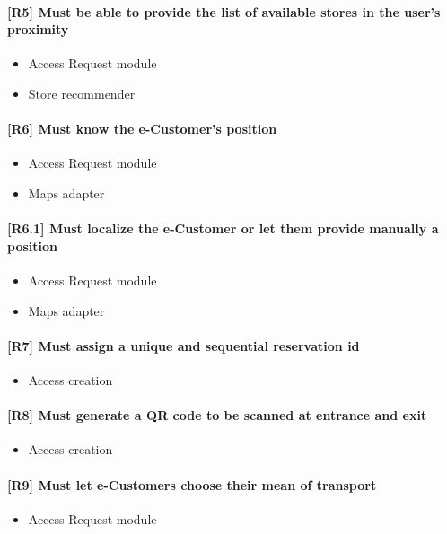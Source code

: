 \paragraph{[R5] Must be able to provide the list of available stores in the user’s proximity}
\begin{itemize}[itemsep=-1mm, topsep=-1mm]
	\item Access Request module
	\item Store recommender
\end{itemize}

\paragraph{[R6] Must know the e-Customer’s position}
\begin{itemize}[itemsep=-1mm, topsep=-1mm]
	\item Access Request module
	\item Maps adapter
\end{itemize}

\paragraph{[R6.1] Must localize the e-Customer or let them provide manually a position}
\begin{itemize}[itemsep=-1mm, topsep=-1mm]
	\item Access Request module
	\item Maps adapter
\end{itemize}

\paragraph{[R7] Must assign a unique and sequential reservation id}
\begin{itemize}[itemsep=-1mm, topsep=-1mm]
	\item Access creation
\end{itemize}

\paragraph{[R8] Must generate a QR code to be scanned at entrance and exit}
\begin{itemize}[itemsep=-1mm, topsep=-1mm]
	\item Access creation
\end{itemize}

\paragraph{[R9] Must let e-Customers choose their mean of transport}
\begin{itemize}[itemsep=-1mm, topsep=-1mm]
	\item Access Request module
\end{itemize}

